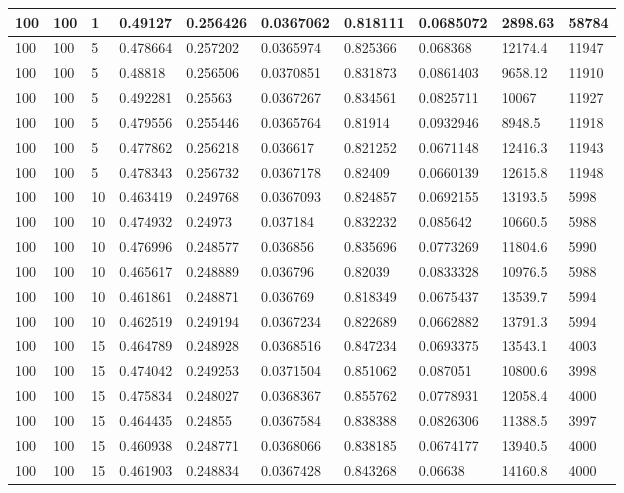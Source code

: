 \begin{landscape}
\begin{longtable}{ | l | l | l | l | l | l | l | l | l | l | }
100 & 100 & 1 & 0.49127 & 0.256426 & 0.0367062 & 0.818111 & 0.0685072 & 2898.63 & 58784\\ \hline
100 & 100 & 5 & 0.478664 & 0.257202 & 0.0365974 & 0.825366 & 0.068368 & 12174.4 & 11947\\ \hline
100 & 100 & 5 & 0.48818 & 0.256506 & 0.0370851 & 0.831873 & 0.0861403 & 9658.12 & 11910\\ \hline
100 & 100 & 5 & 0.492281 & 0.25563 & 0.0367267 & 0.834561 & 0.0825711 & 10067 & 11927\\ \hline
100 & 100 & 5 & 0.479556 & 0.255446 & 0.0365764 & 0.81914 & 0.0932946 & 8948.5 & 11918\\ \hline
100 & 100 & 5 & 0.477862 & 0.256218 & 0.036617 & 0.821252 & 0.0671148 & 12416.3 & 11943\\ \hline
100 & 100 & 5 & 0.478343 & 0.256732 & 0.0367178 & 0.82409 & 0.0660139 & 12615.8 & 11948\\ \hline
100 & 100 & 10 & 0.463419 & 0.249768 & 0.0367093 & 0.824857 & 0.0692155 & 13193.5 & 5998\\ \hline
100 & 100 & 10 & 0.474932 & 0.24973 & 0.037184 & 0.832232 & 0.085642 & 10660.5 & 5988\\ \hline
100 & 100 & 10 & 0.476996 & 0.248577 & 0.036856 & 0.835696 & 0.0773269 & 11804.6 & 5990\\ \hline
100 & 100 & 10 & 0.465617 & 0.248889 & 0.036796 & 0.82039 & 0.0833328 & 10976.5 & 5988\\ \hline
100 & 100 & 10 & 0.461861 & 0.248871 & 0.036769 & 0.818349 & 0.0675437 & 13539.7 & 5994\\ \hline
100 & 100 & 10 & 0.462519 & 0.249194 & 0.0367234 & 0.822689 & 0.0662882 & 13791.3 & 5994\\ \hline
100 & 100 & 15 & 0.464789 & 0.248928 & 0.0368516 & 0.847234 & 0.0693375 & 13543.1 & 4003\\ \hline
100 & 100 & 15 & 0.474042 & 0.249253 & 0.0371504 & 0.851062 & 0.087051 & 10800.6 & 3998\\ \hline
100 & 100 & 15 & 0.475834 & 0.248027 & 0.0368367 & 0.855762 & 0.0778931 & 12058.4 & 4000\\ \hline
100 & 100 & 15 & 0.464435 & 0.24855 & 0.0367584 & 0.838388 & 0.0826306 & 11388.5 & 3997\\ \hline
100 & 100 & 15 & 0.460938 & 0.248771 & 0.0368066 & 0.838185 & 0.0674177 & 13940.5 & 4000\\ \hline
100 & 100 & 15 & 0.461903 & 0.248834 & 0.0367428 & 0.843268 & 0.06638 & 14160.8 & 4000\\ \hline

\end{longtable}
\end{landscape}
